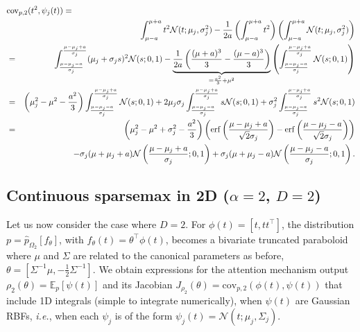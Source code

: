 \documentclass{article}
\begin{document}
\begin{eqnarray}
\lefteqn{\mathrm{cov}_{p, 2}(t^2, \psi_j(t)) =} \nonumber\\
&& \int_{\mu-a}^{\mu+a} t^2\mathcal{N}(t; \mu_j, \sigma_j^2)
- \frac{1}{2a}\left(\int_{\mu-a}^{\mu+a} t^2\right)\left(\int_{\mu-a}^{\mu+a} \mathcal{N}(t; \mu_j, \sigma_j^2)\right)
\nonumber\\
&=&
\int_{\frac{\mu-\mu_j-a}{\sigma_j}}^{\frac{\mu-\mu_j+a}{\sigma_j}} (\mu_j + \sigma_j s)^2\mathcal{N}(s; 0, 1)
- \underbrace{\frac{1}{2a}\left( \frac{(\mu+a)^3}{3} - \frac{(\mu-a)^3}{3} \right)}_{=\frac{a^2}{3} + \mu^2} 
\left( \int_{\frac{\mu-\mu_j-a}{\sigma_j}}^{\frac{\mu-\mu_j+a}{\sigma_j}} \mathcal{N}(s; 0, 1) \right)\nonumber\\
&=&
\left(\mu_j^2-\mu^2 -\frac{a^2}{3}\right)\int_{\frac{\mu-\mu_j-a}{\sigma_j}}^{\frac{\mu-\mu_j+a}{\sigma_j}} \mathcal{N}(s; 0, 1)
+ 2\mu_j\sigma_j \int_{\frac{\mu-\mu_j-a}{\sigma_j}}^{\frac{\mu-\mu_j+a}{\sigma_j}} s\mathcal{N}(s; 0, 1)
+ \sigma_j^2 \int_{\frac{\mu-\mu_j-a}{\sigma_j}}^{\frac{\mu-\mu_j+a}{\sigma_j}} s^2\mathcal{N}(s; 0, 1)
\nonumber\\
&=&
\left(\mu_j^2-\mu^2 +\sigma_j^2 -\frac{a^2}{3}\right)\left( \mathrm{erf}\left( \frac{\mu-\mu_j+a}{\sqrt{2}\sigma_j} \right) - \mathrm{erf}\left( \frac{\mu-\mu_j-a}{\sqrt{2}\sigma_j} \right)\right)\nonumber\\
&& -\sigma_j(\mu+\mu_j+a) \mathcal{N}\left(\frac{\mu-\mu_j+a}{\sigma_j}; 0, 1\right) + \sigma_j(\mu+\mu_j-a) \mathcal{N}\left(\frac{\mu-\mu_j-a}{\sigma_j}; 0, 1\right).
\end{eqnarray}



\subsection{Continuous sparsemax in 2D ($\alpha=2$, $D=2$)}

Let us now consider the case where $D=2$. 
For $\phi(t)=[t,tt^\top]$, the distribution $p=\hat{p}_{\Omega_2}[f_\theta]$, with $f_\theta(t)=\theta^\top \phi(t)$, becomes a bivariate truncated paraboloid where $\mu$ and  $\Sigma$ are related to the canonical parameters as before, $\theta=[\Sigma^{-1}\mu,-\frac{1}{2}\Sigma^{-1}]$. We obtain expressions for the attention mechanism output $\rho_2(\theta)=\mathbb{E}_p[\psi(t)]$ and its Jacobian $J_{\rho_2}(\theta)= \mathrm{cov}_{p,2}(\phi(t), \psi(t))$ that include 1D integrals (simple to integrate numerically), when $\psi(t)$ are Gaussian RBFs, {\it i.e.}, when each $\psi_j$ is of the form $\psi_j(t)=\mathcal{N}(t;\mu_j, \Sigma_j)$.
\end{document}
